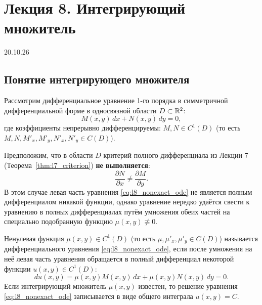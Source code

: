 \section{Лекция 8. Интегрирующий множитель}

\begin{flushright}
    20.10.26
\end{flushright}

\subsection{Понятие интегрирующего множителя}

Рассмотрим дифференциальное уравнение 1-го порядка в симметричной
дифференциальной форме в односвязной области $D \subset \mathbb{R}^2$:
\begin{equation} \label{eq:l8_nonexact_ode}
    M(x, y) \, dx + N(x, y) \, dy = 0, \tag{1}
\end{equation}
где коэффициенты непрерывно дифференцируемы: $M, N \in C^1(D)$ (то есть
$M, N, M'_x, M'_y, N'_x, N'_y \in C(D)$).

Предположим, что в области $D$ критерий полного дифференциала из Лекции 7
(Теорема~\ref{thm:l7_criterion}) \textbf{не выполняется}:
\begin{equation} \label{eq:l8_ineq_ exact}
    \frac{\partial N}{\partial x} \neq \frac{\partial M}{\partial y}. \tag{2}
\end{equation}
В этом случае левая часть уравнения \eqref{eq:l8_nonexact_ode} не является
полным дифференциалом никакой функции, однако уравнение нередко удаётся свести
к уравнению в полных дифференциалах путём умножения обеих частей на специально
подобранную функцию $\mu(x, y) \not\equiv 0$.

\begin{definition}
    Ненулевая функция $\mu(x, y) \in C^1(D)$ (то есть
    $\mu, \mu'_x, \mu'_y \in C(D)$) называется  дифференциального уравнения \eqref{eq:l8_nonexact_ode}, если
    после умножения на неё левая часть уравнения обращается в полный
    дифференциал некоторой функции $u(x, y) \in C^1(D)$:
    \begin{equation} \label{eq:l8_du_mu}
        du(x, y) = \mu(x, y) M(x, y) \, dx + \mu(x, y) N(x, y) \, dy = 0.
        \tag{3}
    \end{equation}
    Если интегрирующий множитель $\mu(x, y)$ известен, то решение уравнения
    \eqref{eq:l8_nonexact_ode} записывается в виде общего интеграла
    $u(x, y) = C$.
\end{definition}

